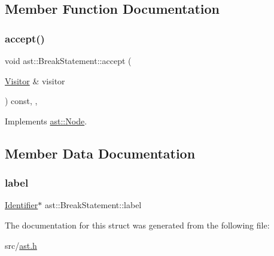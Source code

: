\subsection{Member Function Documentation}
\mbox{\label{structast_1_1_break_statement_ac7db635ee58478c5f917a85bd7c70b79}} 
\subsubsection{\texorpdfstring{accept()}{accept()}}
{\footnotesize\ttfamily void ast\+::\+Break\+Statement\+::accept (\begin{DoxyParamCaption}\item[{\hyperlink{structast_1_1_visitor}{Visitor} \&}]{visitor }\end{DoxyParamCaption}) const\hspace{0.3cm}{\ttfamily [inline]}, {\ttfamily [override]}, {\ttfamily [virtual]}}



Implements \hyperlink{structast_1_1_node_abc089ee6caaf06a4445ebdd8391fdebc}{ast\+::\+Node}.



\subsection{Member Data Documentation}
\mbox{\label{structast_1_1_break_statement_ad38ca9b59202df6aad6e4ab09fc8316d}} 
\subsubsection{\texorpdfstring{label}{label}}
{\footnotesize\ttfamily \hyperlink{structast_1_1_identifier}{Identifier}$\ast$ ast\+::\+Break\+Statement\+::label}



The documentation for this struct was generated from the following file\+:\begin{DoxyCompactItemize}
\item 
src/\hyperlink{ast_8h}{ast.\+h}\end{DoxyCompactItemize}
